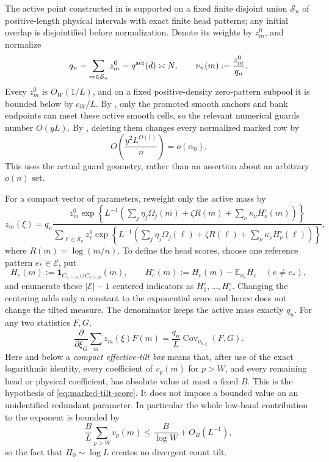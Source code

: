 \documentclass[11pt]{article}
\numberwithin{equation}{section}
\theoremstyle{definition}
\theoremstyle{remark}
\newcommand{\1}{\mathbf 1}
\begin{document}
The active point constructed in
 is supported on a fixed finite
disjoint union \(\mathcal S_n\) of positive-length physical intervals
with exact finite head patterns; any initial overlap is disjointified
before normalization.  Denote its weights by \(z_m^0\), and normalize
\[
 q_n=\sum_{m\in\mathcal S_n}z_m^0=q^{\rm act}(d)\asymp N,
 \qquad
 \nu_n(m):=\frac{z_m^0}{q_n}.
\]
Every \(z_m^0\) is \(O_W(1/L)\), and on a fixed positive-density
zero-pattern subpool it is bounded below by \(c_W/L\).  By
, only the promoted smooth anchors and bank
endpoints can meet these active smooth cells, so the relevant numerical
guards number \(O(yL)\).  By
, deleting them changes every
normalized marked row by
\[
 O\!\left(\frac{y^2L^{O(1)}}n\right)=o(\alpha_0).
\]
This uses the actual guard geometry, rather than an assertion about an
arbitrary \(o(n)\) set.

For a compact vector of parameters, reweight only the active mass by
\begin{equation}
 z_m(\xi)=
 q_n\frac{z_m^0
   \exp\!\left\{L^{-1}\left(
       \sum_j\eta_j\Omega_j(m)+\zeta R(m)
             +\sum_\nu\kappa_\nu H_\nu^\circ(m)\right)\right\}}
 {\displaystyle\sum_{\ell\in\mathcal S_n}z_\ell^0
   \exp\!\left\{L^{-1}\left(
       \sum_j\eta_j\Omega_j(\ell)+\zeta R(\ell)
             +\sum_\nu\kappa_\nu H_\nu^\circ(\ell)\right)\right\}},
\label{eq:smooth-exponential-family}
\end{equation}
where \(R(m)=\log(m/n)\).  To define the head scores, choose one reference
pattern \(e_*\in\mathscr E\), put
\[
 H_e(m):=\1_{C_{e,-,n}\cup C_{e,+,n}}(m),\qquad
 H_e^\circ(m):=H_e(m)-\mathbb E_{\nu_n}H_e\quad(e\ne e_*),
\]
and enumerate these \(|\mathscr E|-1\) centered indicators as
\(H_1^\circ,\ldots,H_e^\circ\).  Changing the centering adds only a
constant to the exponential score and hence does not change the tilted
measure.  The denominator keeps the active mass exactly \(q_n\).  For any
two statistics \(F,G\),
\begin{equation}
 \frac{\partial}{\partial \xi_G}
       \sum_m z_m(\xi)F(m)
       =\frac{q_n}{L}\operatorname{Cov}_{\nu_{n,\xi}}(F,G).
\label{eq:smooth-covariance-Jacobian}
\end{equation}
Here and below a \emph{compact effective-tilt box} means that, after use
of the exact logarithmic identity, every coefficient of \(v_p(m)\) for
\(p>W\), and every remaining head or physical coefficient, has absolute
value at most a fixed \(B\).  This is the hypothesis of
\eqref{eq:marked-tilt-score}.  It does not impose a bounded value on an
unidentified redundant parameter.  In particular the whole low-band
contribution to the exponent is bounded by
\[
 \frac{B}{L}\sum_{p>W}v_p(m)\leq\frac{B}{\log W}+O_B(L^{-1}),
\]
so the fact that \(H_0\sim\log L\) creates no divergent count tilt.
\end{document}
